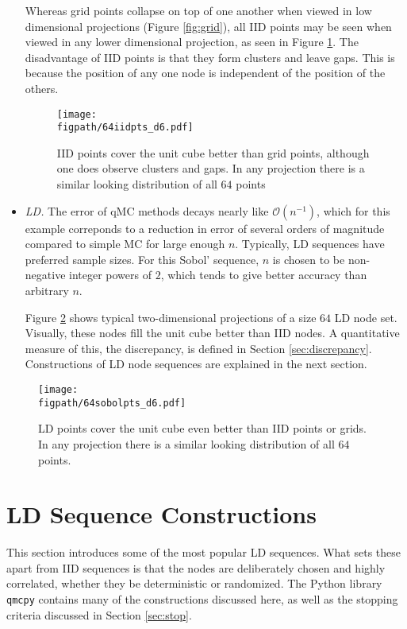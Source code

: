 \documentclass{svproc}
\newcommand{\figpath}{Figures}
\begin{document}
\begin{itemize}
	Whereas grid points collapse on top of one another when viewed in low dimensional projections (Figure \ref{fig:grid}), all IID points may be seen when viewed in any lower dimensional projection, as seen in Figure \ref{fig:iid}.  The disadvantage of IID points is that they form clusters and leave gaps.  This is because the position of any one node is independent of the position of the others.

\begin{figure}
	\centering
	\texttt{[image: \\figpath/64iidpts\_d6.pdf]}
	\caption{IID points cover the unit cube better than grid points, although one does observe clusters and gaps.  In any  projection there is  a similar looking distribution of all $64$ points \label{fig:iid}}
\end{figure}

	\item \emph{LD.}  The error of qMC methods decays nearly like $\mathcal{O}(n^{-1})$, which for this example correponds to a reduction in error of several orders of magnitude compared to simple MC for large enough $n$.  Typically, LD sequences have preferred sample sizes.  For this Sobol' sequence, $n$ is chosen to be non-negative integer powers of $2$, which tends to give better accuracy than arbitrary $n$.

	Figure \ref{fig:ld} shows typical two-dimensional projections of a size $64$ LD node set.  Visually, these nodes fill the unit cube better than IID nodes.  A quantitative measure of this, the discrepancy, is defined in Section \ref{sec:discrepancy}.  Constructions of LD node sequences are explained in the next section.

\end{itemize}



\begin{figure}
	\centering
	\texttt{[image: \\figpath/64sobolpts\_d6.pdf]}
	\caption{LD points cover the unit cube even better than IID points or grids.  In any  projection there is  a similar looking distribution of all $64$ points. \label{fig:ld}}
\end{figure}


\section{LD Sequence Constructions} \label{sec:construct}
This section introduces some of the most popular LD sequences.  What sets these apart from IID sequences is that the nodes are deliberately chosen and highly correlated, whether they be deterministic or randomized. The Python library \texttt{qmcpy} \cite{QMCPy2020a} contains many of the constructions discussed here, as well as the stopping criteria discussed in Section \ref{sec:stop}.
\end{document}
